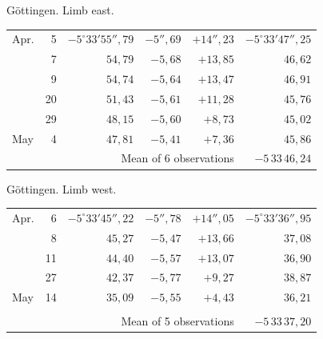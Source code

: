 \noindent\begin{minipage}[t]{.495\textwidth}\centering Göttingen. Limb east.\par\smallskip
{\scriptsize\setlength{\tabcolsep}{1pt}\renewcommand{\arraystretch}{1.2}\begin{tabular}{lr|r|r|r|r|}
Apr.&5&$-5^\circ33'55''{,}79$&$-5''{,}69$&$+14''{,}23$&$-5^\circ33'47''{,}25$\\
&7&$54{,}79$&$-5{,}68$&$+13{,}85$&$46{,}62$\\
&9&$54{,}74$&$-5{,}64$&$+13{,}47$&$46{,}91$\\
&20&$51{,}43$&$-5{,}61$&$+11{,}28$&$45{,}76$\\
&29&$48{,}15$&$-5{,}60$&$+8{,}73$&$45{,}02$\\
May&4&$47{,}81$&$-5{,}41$&$+7{,}36$&$45{,}86$\\
\cline{6-6}\multicolumn{5}{r}{Mean of 6 observations}&$-5\,33\,46{,}24$
\end{tabular}}\end{minipage}\hfill\begin{minipage}[t]{.495\textwidth}\centering Göttingen. Limb west.\par\smallskip
{\scriptsize\setlength{\tabcolsep}{1pt}\renewcommand{\arraystretch}{1.2}\begin{tabular}{lr|r|r|r|r}
Apr.&6&$-5^\circ33'45''{,}22$&$-5''{,}78$&$+14''{,}05$&$-5^\circ33'36''{,}95$\\
&8&$45{,}27$&$-5{,}47$&$+13{,}66$&$37{,}08$\\
&11&$44{,}40$&$-5{,}57$&$+13{,}07$&$36{,}90$\\
&27&$42{,}37$&$-5{,}77$&$+9{,}27$&$38{,}87$\\
May&14&$35{,}09$&$-5{,}55$&$+4{,}43$&$36{,}21$\\
&&&&&\\
\cline{6-6}\multicolumn{5}{r}{Mean of 5 observations}&$-5\,33\,37{,}20$
\end{tabular}}\end{minipage}
\par\vspace{4mm}


